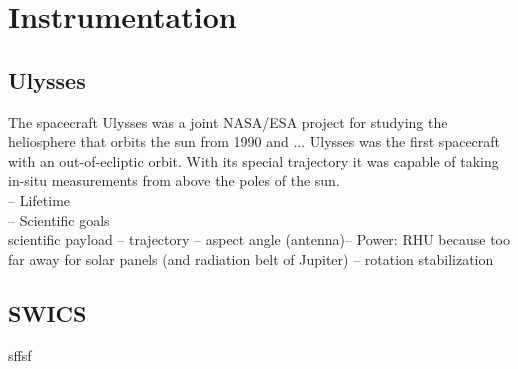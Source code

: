 
\chapter{Instrumentation} %

\label{ChapterInstrumentation} 



\section{Ulysses}
The spacecraft Ulysses was a joint NASA/ESA project for studying the heliosphere that orbits the sun from 1990 and ...
Ulysses was the first spacecraft with an out-of-ecliptic orbit. With its special trajectory it was capable of taking in-situ measurements from above the poles of the sun. \\
-- Lifetime \\
-- Scientific goals\\


scientific payload  -- trajectory -- aspect angle (antenna)-- Power: RHU because too far away for solar panels (and radiation belt of Jupiter) -- rotation stabilization
\section{SWICS}
sffsf